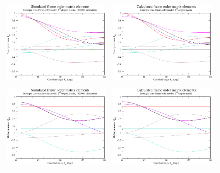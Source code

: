 \begin{figure}
\centering
  \begin{tabular}{@{}cc@{}}
    \includegraphics[width=.5\textwidth]{images/frame_order_matrix/Sijkl_iso_cone_in_frame_theta_x_ens1000000.eps} &
    \includegraphics[width=.5\textwidth]{images/frame_order_matrix/Sijkl_iso_cone_in_frame_theta_x_calc.eps} \\
    \\[-5pt]
    \includegraphics[width=.5\textwidth]{images/frame_order_matrix/Sijkl_iso_cone_in_frame_theta_z_ens1000000.eps} &
    \includegraphics[width=.5\textwidth]{images/frame_order_matrix/Sijkl_iso_cone_in_frame_theta_z_calc.eps} \\

\end{tabular}
\end{figure}

